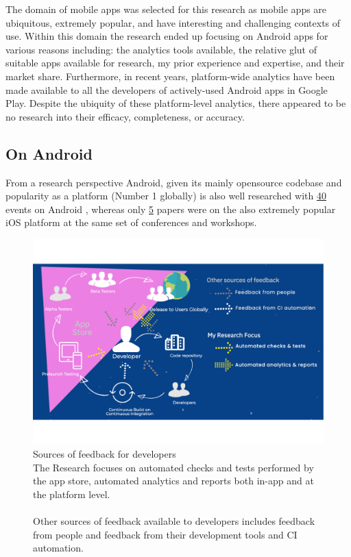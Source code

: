 The domain of mobile apps was selected for this research as mobile apps are ubiquitous, extremely popular, and have interesting and challenging contexts of use. Within this domain the research ended up focusing on Android apps for various reasons including: the analytics tools available, the relative glut of suitable apps available for research, my prior experience and expertise, and their market share. Furthermore, in recent years, platform-wide analytics have been made available to all the developers of actively-used Android apps in Google Play. Despite the ubiquity of these platform-level analytics, there appeared to be no research into their efficacy, completeness, or accuracy.

\subsection{On Android}
From a research perspective Android, given its mainly opensource codebase and popularity as a platform (Number 1 globally) is also well researched with 
\href{https://conf.researchr.org/search/icse-2022/android/events}{40} events on Android %
, whereas only \href{https://conf.researchr.org/search/icse-2022/ios/events}{5} %
papers were on the also extremely popular iOS platform at the same set of conferences and workshops.

\begin{figure}
    \includegraphics[width=\linewidth]{images/mobilesoft/silvias-developer-centric-figure-mobilesoft2020.pdf}
    \caption[Sources of feedback for developers]{Sources of feedback for developers \\The Research focuses on automated checks and tests performed by the app store, automated analytics and reports both in-app and at the platform level. \\ \\Other sources of feedback available to developers includes feedback from people and feedback from their development tools and CI automation.}
    \label{fig:sources-of-feedback-for-developers}
\end{figure}

